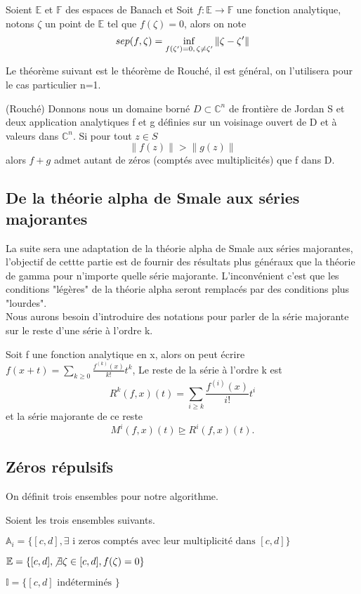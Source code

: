 \documentclass[a4paper,10.5pt]{article}
\begin{document}
	\begin{definition} Soient $\mathbb{E}$ et $\mathbb{F}$ des espaces de Banach et 
		Soit $f:\mathbb{E}\rightarrow \mathbb{F}$ une fonction analytique, notons $\zeta$ un point de $\mathbb{E}$ tel que $f(\zeta)=0$, alors on note
		\begin{equation}
		 sep(f,\zeta)=\inf_{f(\zeta ')=0, \hspace{0.5mm} \zeta \neq \zeta '}\left\|\zeta-\zeta '\right\|
		\end{equation}
		
	\end{definition}
	Le théorème suivant est le théorème de Rouché, il est général, on l'utilisera pour le cas particulier n=1.

	\begin{theorem}(Rouché) Donnons nous un domaine borné $D \subset \mathbb{C}^{n}$ de frontière de Jordan S et deux application analytiques f et g définies sur un voisinage ouvert de D et à valeurs dans $\mathbb{C}^n$. Si pour tout $z \in S$ 
	\[\left\|f(z)\right\|>\left\|g(z)\right\|\]
	alors $f+g$ admet autant de zéros (comptés avec multiplicités) que f dans D.
	\end{theorem}
	
	
	\subsection{De la théorie alpha de Smale aux séries majorantes}
	
	La suite sera une adaptation de la théorie alpha de Smale aux séries majorantes, l'objectif de cettte partie est de fournir des résultats plus généraux que la théorie de gamma pour n'importe quelle série majorante. L'inconvénient c'est que les conditions "légères" de la théorie alpha seront remplacés par des conditions plus "lourdes". \cite{dedieu2006points}\\
	Nous aurons besoin d'introduire des notations pour parler de la série majorante sur le reste d'une série à l'ordre k.
	\begin{definition} Soit f une fonction analytique en x, alors on peut écrire $f(x+t)=\sum_{k \geq 0} \frac{f^{(k)}(x)}{k!}t^{k}$, Le reste de la série à l'ordre k est 
	\[R^{k}(f,x)(t)=\sum_{i \geq k} \frac{f^{(i)}(x)}{i!}t^{i}\]
	et la série majorante de ce reste
	\[M^{i}(f,x)(t) \unrhd R^{i}(f,x)(t).\]
	\end{definition}
	
	\subsection{Zéros répulsifs}
	On définit trois ensembles pour notre algorithme.
	\begin{definition} Soient les trois ensembles suivants.
		
	$\mathbb{A}_i=\{[c,d], \exists \text{ i zeros comptés avec leur multiplicité dans } [c,d]\}$
	
	$\mathbb{E}=\{[c,d], \not\exists \zeta \in [c,d], f(\zeta)=0\}$
	
	$\mathbb{I}=\{[c,d] \text{ indéterminés }\}$\\
	\end{definition}
\end{document}
